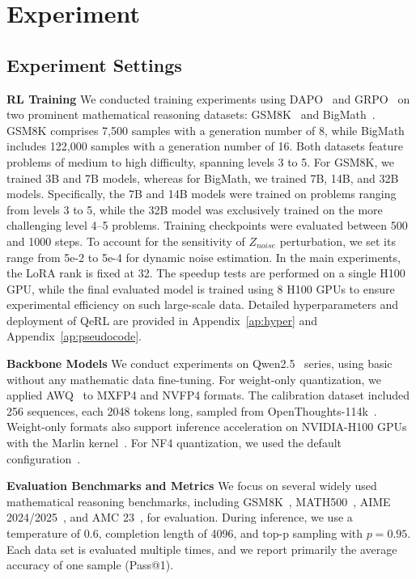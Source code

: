 \section{Experiment}

\subsection{Experiment Settings}\label{exp:setting}

\textbf{RL Training}
We conducted training experiments using DAPO~\citep{dapo} and GRPO~\citep{grpo} on two prominent mathematical reasoning datasets: GSM8K~\citep{cobbe2021training} and BigMath~\citep{albalak2025big}. GSM8K comprises 7,500 samples with a generation number of 8, while BigMath includes 122,000 samples with a generation number of 16. Both datasets feature problems of medium to high difficulty, spanning levels 3 to 5. For GSM8K, we trained 3B and 7B models, whereas for BigMath, we trained 7B, 14B, and 32B models. Specifically, the 7B and 14B models were trained on problems ranging from levels 3 to 5, while the 32B model was exclusively trained on the more challenging level 4–5 problems. Training checkpoints were evaluated between 500 and 1000 steps. To account for the sensitivity of $Z_{noise}$ perturbation, we set its range from 5e-2 to 5e-4 for dynamic noise estimation. In the main experiments, the LoRA rank is fixed at 32. The speedup tests are performed on a single H100 GPU, while the final evaluated model is trained using 8 H100 GPUs to ensure experimental efficiency on such large-scale data. Detailed hyperparameters and deployment of QeRL are provided in Appendix~\ref{ap:hyper} and Appendix~\ref{ap:pseudocode}.

\textbf{Backbone Models}
We conduct experiments on Qwen2.5~\citep{team2024qwen2} series, using basic without any mathematic data fine-tuning. For weight-only quantization, we applied AWQ~\citep{lin2024awq} to MXFP4 and NVFP4 formats. The calibration dataset included 256 sequences, each 2048 tokens long, sampled from OpenThoughts-114k~\citep{guha2025openthoughts}. Weight-only formats also support inference acceleration on NVIDIA-H100 GPUs with the Marlin kernel~\citep{frantar2024marlin}. For NF4 quantization, we used the default configuration~\citep{qlora}.

\textbf{Evaluation Benchmarks and Metrics}
We focus on several widely used mathematical reasoning benchmarks, including GSM8K~\citep{cobbe2021training}, MATH500~\citep{lightman2023let}, AIME 2024/2025~\citep{li2024numinamath}, and AMC 23~\citep{li2024numinamath}, for evaluation. During inference, we use a temperature of 0.6, completion length of 4096, and top-p sampling with $p = 0.95$. Each data set is evaluated multiple times, and we report primarily the average accuracy of one sample (Pass@1).

